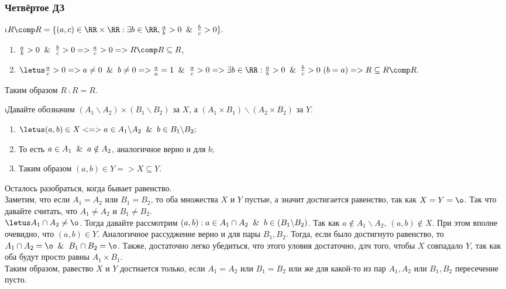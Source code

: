 \subsubsection{Четвёртое ДЗ}


\i $R \comp R = \{(a, c) \in \RR \times \RR: \exists b \in \RR, \frac{a}{b} > 0 \And \frac{b}{c} > 0\}.$ 
\begin{enumerate}
    \item $\frac{a}{b} > 0 \And \frac{b}{c} > 0 => \frac{a}{c} > 0 => R \comp R \subseteq R$,
    \item $\letus \frac{a}{c} > 0 => a \ne 0 \And b \ne 0 => \frac{a}{a} = 1 \And \frac{a}{c} > 0 => \exists b \in \RR: \frac{a}{b} > 0 \And \frac{b}{c} > 0 \ (b = a) => R \subseteq R \comp R.$
\end{enumerate}
Таким образом $R \comp R = R$.

\i Давайте обозначим $(A_1 \backslash A_2) \times (B_1 \backslash B_2)$ за $X$, а $(A_1 \times B_1) \backslash (A_2 \times B_2)$ за $Y$.
\begin{enumerate}
    \item $\letus (a, b) \in X <=> a \in A_1 \backslash A_2 \And b \in B_1 \backslash B_2;$
    \item То есть $a \in A_1 \And a \notin A_2$, аналогичное верно и для $b$;
    \item Таким образом $(a, b) \in Y => X \subseteq Y$.
\end{enumerate}
Осталось разобраться, когда бывает равенство.\\
Заметим, что если $A_1 = A_2$ или $B_1 = B_2$, то оба множества $X$ и $Y$ пустые, а значит достигается равенство, так как $X = Y = \o$. Так что давайте считать, что $A_1 \ne A_2$ и $B_1 \ne B_2$.\\
$\letus A_1 \cap A_2 \ne \o$. Тогда давайте рассмотрим $(a, b): a \in A_1 \cap A_2 \And b \in (B_1 \backslash B_2)$. Так как $a \notin A_1 \backslash A_2, \ (a, b) \notin X$. При этом вполне очевидно, что $(a, b) \in Y$. Аналогичное рассуджение верно и для пары $B_1, B_2$. Тогда, если было достигнуто равенство, то $A_1 \cap A_2 = \o \And B_1 \cap B_2 = \o$. Также, достаточно легко убедиться, что этого уловия достаточно, длч того, чтобы $X$ совпадало $Y$, так как оба будут просто равны $A_1 \times B_1$.\\
Таким образом, равество $X$ и $Y$ достиается только, если $A_1 = A_2$ или $B_1 = B_2$ или же для какой-то из пар $A_1, A_2$ или $B_1, B_2$ пересечение пусто.

